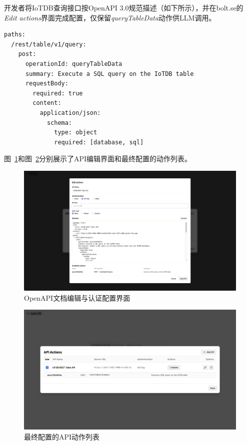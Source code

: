 开发者将IoTDB查询接口按OpenAPI 3.0规范描述（如下所示），并在bolt.se的\textit{Edit actions}界面完成配置，仅保留\textit{queryTableData}动作供LLM调用。

\begin{verbatim}
paths:
  /rest/table/v1/query:
    post:
      operationId: queryTableData
      summary: Execute a SQL query on the IoTDB table
      requestBody:
        required: true
        content:
          application/json:
            schema:
              type: object
              required: [database, sql]
\end{verbatim}

图~\ref{fig:openapi-editor}和图~\ref{fig:api-actions}分别展示了API编辑界面和最终配置的动作列表。

\begin{figure}[htbp]
  \centering
  \includegraphics[width=.7\textwidth]{figures/screenshots/iotdb-demo/openapi-editor.png}
  \caption{OpenAPI文档编辑与认证配置界面}
  \label{fig:openapi-editor}
\end{figure}

\begin{figure}[htbp]
  \centering
  \includegraphics[width=.9\textwidth]{figures/screenshots/iotdb-demo/api-actions.png}
  \caption{最终配置的API动作列表}
  \label{fig:api-actions}
\end{figure}

